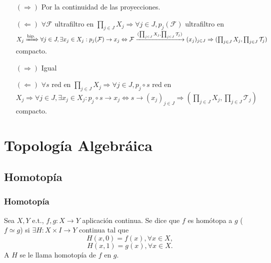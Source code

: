 \begin{dem}[Filtros]
  \begin{enumerate}[label=(\roman*)]
    \item []
    \item [$(\Rightarrow)$] Por la continuidad de las proyecciones.
    \item [$(\Leftarrow)$] $\forall \mathcal{F}$ ultrafiltro en $\prod_{j \in J} X_{j} \Rightarrow \forall j \in J, p_{j}(\mathcal{F})$ ultrafiltro en $X_{j} \xRightarrow[]{ \text{hip.} } \forall j \in J, \exists x_{j} \in X_{j} : p_{j}(\mathcal{F}) \rightarrow x_{j} \Leftrightarrow \mathcal{F} \xrightarrow[]{ ( \prod_{j \in J} X_{j}, \prod_{j \in J} \mathcal{T}_{j} ) } (x_{j})_{j \in J} \Rightarrow ( \prod_{j \in J} X_{j}, \prod_{j \in J} \mathcal{T}_{j} )$ compacto.
  \end{enumerate}
\end{dem}

\begin{dem}[Redes]
  \begin{enumerate}[label=(\roman*)]
    \item []
    \item [$(\Rightarrow)$] Igual
    \item [$(\Leftarrow)$] $\forall s$ red en $\prod_{j \in J} X_{j} \Rightarrow \forall j \in J, p_{j} \circ s$ red en $X_{j} \Rightarrow \forall j \in J, \exists x_{j} \in X_{j} : p_{j} \circ s \rightarrow x_{j} \Leftrightarrow s \rightarrow ( x_{j} )_{j \in J} \Rightarrow ( \prod_{j \in J} X_{j}, \prod_{j \in J} \mathcal{T}_{j} )$ compacto.
  \end{enumerate}
\end{dem}


\part{Topología Algebráica}
\chapter{Homotopía}

\section{Homotopía}

\begin{defn}[Homotopía]
  Sea $X, Y$ e.t., $f,g : X \to Y$ aplicación continua. Se dice que $f$ es homótopa a $g$ ($f \simeq g$) si $\exists H : X \times I \to Y$ continua tal que
  \[ 
    H(x,0) = f(x), \forall x \in X,
  \] 
  \[ 
    H(x,1) = g(x), \forall x \in X.
  \] 
  A $H$ se le llama homotopía de $f$ en $g$.
\end{defn}

